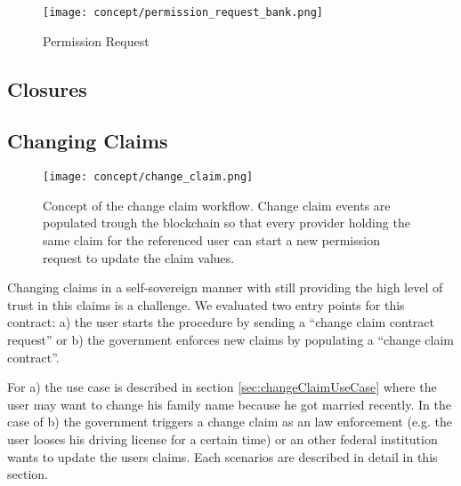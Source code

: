 \begin{figure}[ht]
\centering
\texttt{[image: concept/permission\_request\_bank.png]}
\caption{Permission Request}
\label{fig:permission_request}
\end{figure}

\subsection{Closures}
\begin{comment}
\begin{figure}[ht]
\centering
\texttt{[image: concept/closure.png]}
\caption{Closure}
\label{fig:closure}
\end{figure}
\end{comment}

\subsection{Changing Claims}

\begin{figure}
 \texttt{[image: concept/change\_claim.png]}
 \centering
\caption{Concept of the change claim workflow. Change claim events are populated trough the blockchain so that every provider holding the same claim for the referenced user can start a new permission request to update the claim values.}
\label{fig:changeClaimsFig}
\end{figure}

Changing claims in a self-sovereign manner with still providing the high level of trust in this claims is a challenge. We evaluated two entry points for this contract: a) the user starts the procedure by sending a “change claim contract request” or b) the government enforces new claims by populating a “change claim contract”. 

For a) the use case is described in section \ref{sec:changeClaimUseCase} where the user may want to change his family name because he got married recently. In the case of b) the government triggers a change claim as an law enforcement (e.g. the user looses his driving license for a certain time) or an other federal institution wants to update the users claims. Each scenarios are described in detail in this section. 

